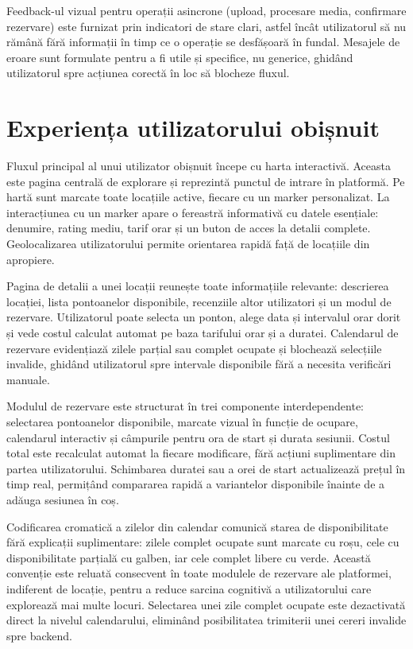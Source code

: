 Feedback-ul vizual pentru operații asincrone (upload, procesare media, confirmare rezervare) este furnizat prin indicatori de stare clari, astfel încât utilizatorul să nu rămână fără informații în timp ce o operație se desfășoară în fundal. Mesajele de eroare sunt formulate pentru a fi utile și specifice, nu generice, ghidând utilizatorul spre acțiunea corectă în loc să blocheze fluxul.

\section{Experiența utilizatorului obișnuit}

Fluxul principal al unui utilizator obișnuit începe cu harta interactivă. Aceasta este pagina centrală de explorare și reprezintă punctul de intrare în platformă. Pe hartă sunt marcate toate locațiile active, fiecare cu un marker personalizat. La interacțiunea cu un marker apare o fereastră informativă cu datele esențiale: denumire, rating mediu, tarif orar și un buton de acces la detalii complete. Geolocalizarea utilizatorului permite orientarea rapidă față de locațiile din apropiere.


Pagina de detalii a unei locații reunește toate informațiile relevante: descrierea locației, lista pontoanelor disponibile, recenziile altor utilizatori și un modul de rezervare. Utilizatorul poate selecta un ponton, alege data și intervalul orar dorit și vede costul calculat automat pe baza tarifului orar și a duratei. Calendarul de rezervare evidențiază zilele parțial sau complet ocupate și blochează selecțiile invalide, ghidând utilizatorul spre intervale disponibile fără a necesita verificări manuale.

Modulul de rezervare este structurat în trei componente interdependente: selectarea pontoanelor disponibile, marcate vizual în funcție de ocupare, calendarul interactiv și câmpurile pentru ora de start și durata sesiunii. Costul total este recalculat automat la fiecare modificare, fără acțiuni suplimentare din partea utilizatorului. Schimbarea duratei sau a orei de start actualizează prețul în timp real, permițând compararea rapidă a variantelor disponibile înainte de a adăuga sesiunea în coș.

Codificarea cromatică a zilelor din calendar comunică starea de disponibilitate fără explicații suplimentare: zilele complet ocupate sunt marcate cu roșu, cele cu disponibilitate parțială cu galben, iar cele complet libere cu verde. Această convenție este reluată consecvent în toate modulele de rezervare ale platformei, indiferent de locație, pentru a reduce sarcina cognitivă a utilizatorului care explorează mai multe locuri. Selectarea unei zile complet ocupate este dezactivată direct la nivelul calendarului, eliminând posibilitatea trimiterii unei cereri invalide spre backend.

